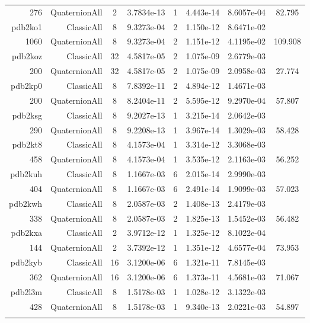 \begin{xltabular}{\textwidth}{r|rcS[table-format=1.4e+2]cS[table-format=1.3e+2]S[table-format=1.4e+2]S[table-format=-1.3]}
276 & QuaternionAll & 2 & 3.7834e-13 & 1 & 4.443e-14 & 8.6057e-04 & 82.795\\  \addlinespace
pdb2ko1 & ClassicAll & 8 & 9.3273e-04 & 2 & 1.150e-12 & 8.6471e-02 & \\
1060 & QuaternionAll & 8 & 9.3273e-04 & 2 & 1.151e-12 & 4.1195e-02 & 109.908\\  \addlinespace
pdb2koz & ClassicAll & 32 & 4.5817e-05 & 2 & 1.075e-09 & 2.6779e-03 & \\
200 & QuaternionAll & 32 & 4.5817e-05 & 2 & 1.075e-09 & 2.0958e-03 & 27.774\\  \addlinespace
pdb2kp0 & ClassicAll & 8 & 7.8392e-11 & 2 & 4.894e-12 & 1.4671e-03 & \\
200 & QuaternionAll & 8 & 8.2404e-11 & 2 & 5.595e-12 & 9.2970e-04 & 57.807\\  \addlinespace
pdb2ksg & ClassicAll & 8 & 9.2027e-13 & 1 & 3.215e-14 & 2.0642e-03 & \\
290 & QuaternionAll & 8 & 9.2208e-13 & 1 & 3.967e-14 & 1.3029e-03 & 58.428\\  \addlinespace
pdb2kt8 & ClassicAll & 8 & 4.1573e-04 & 1 & 3.314e-12 & 3.3068e-03 & \\
458 & QuaternionAll & 8 & 4.1573e-04 & 1 & 3.535e-12 & 2.1163e-03 & 56.252\\  \addlinespace
pdb2kuh & ClassicAll & 8 & 1.1667e-03 & 6 & 2.015e-14 & 2.9990e-03 & \\
404 & QuaternionAll & 8 & 1.1667e-03 & 6 & 2.491e-14 & 1.9099e-03 & 57.023\\  \addlinespace
pdb2kwh & ClassicAll & 8 & 2.0587e-03 & 2 & 1.408e-13 & 2.4179e-03 & \\
338 & QuaternionAll & 8 & 2.0587e-03 & 2 & 1.825e-13 & 1.5452e-03 & 56.482\\  \addlinespace
pdb2kxa & ClassicAll & 2 & 3.9712e-12 & 1 & 1.325e-12 & 8.1022e-04 & \\
144 & QuaternionAll & 2 & 3.7392e-12 & 1 & 1.351e-12 & 4.6577e-04 & 73.953\\  \addlinespace
pdb2kyb & ClassicAll & 16 & 3.1200e-06 & 6 & 1.321e-11 & 7.8145e-03 & \\
362 & QuaternionAll & 16 & 3.1200e-06 & 6 & 1.373e-11 & 4.5681e-03 & 71.067\\  \addlinespace
pdb2l3m & ClassicAll & 8 & 1.5178e-03 & 1 & 1.028e-12 & 3.1322e-03 & \\
428 & QuaternionAll & 8 & 1.5178e-03 & 1 & 9.340e-13 & 2.0221e-03 & 54.897\\  \addlinespace

\end{xltabular}
